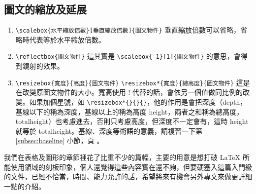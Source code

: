 \subsection{圖文的縮放及延展}

\begin{enumerate}

  \item \verb|\scalebox{水平縮放倍數}[垂直縮放倍數]{圖文物件}| \newline
        垂直縮放倍數可以省略，省略時代表等於水平縮放倍數。

  \item \verb|\reflectbox{圖文物件}| \newline
        這其實是 \verb|\scalebox{-1}[1]{圖文物件}| 的意思，會得到鏡射的效果。

  \item \verb|\resizebox{寬度}{高度}{圖文物件}| \newline \verb|\resizebox*{寬度}{總高度}{圖文物件}| \newline
        這是在改變原圖文物件的大小。寬高使用 {\ttfamily !} 代替的話，會依另一個值做同比例的改變。如果加個星號，如 \verb|\resizebox*{}{}{}|，他的作用是會把深度（depth，基線以下的稱為深度，基線以上的稱為高度 height，兩者之和稱為總高度，totalheight）也考慮進去，否則只考慮高度，但深度不一定會有，這時 height 就等於 totalheight。基線、深度等術語的意義，請複習一下第 \ref{subsec:baseline} 小節，頁 \pageref{subsec:baseline}。

\end{enumerate}

我們在表格及圖形的章節裡花了比重不少的篇幅，主要的用意是想打破 \LaTeX{} 所能使用領域的刻板印象，個人還覺得這些內容實在還不夠，但要硬塞入這篇入門級的文件，已經不恰當，時間、能力允許的話，希望將來有機會另外專文來做更詳細一點的介紹。
